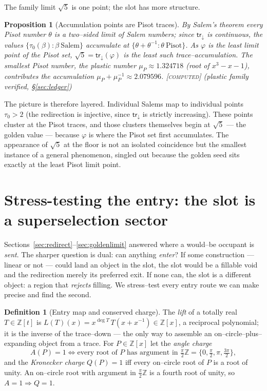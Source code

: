 \documentclass[11pt]{article}
\theoremstyle{plain}
\newtheorem{proposition}[theorem]{Proposition}
\theoremstyle{definition}
\newtheorem{definition}[theorem]{Definition}
\theoremstyle{remark}
\newcommand{\computed}{\textcolor{forcedc}{\textsc{[computed]}}}
\newcommand{\Z}{\mathbb{Z}}
\newcommand{\trace}{\mathsf{tr}_{\!\downarrow}}
\begin{document}
The family limit $\sqrt5$ is one point; the slot has more structure.

\begin{proposition}[Accumulation points are Pisot traces]\label{prop:pisot}
By Salem's theorem every Pisot number $\theta$ is a two--sided limit of Salem numbers; since $\trace$ is continuous, the values $\{\tau_0(\beta):\beta\ \text{Salem}\}$ accumulate at $\{\theta+\theta^{-1}:\theta\ \text{Pisot}\}$. As $\varphi$ is the least limit point of the Pisot set, $\sqrt5=\trace(\varphi)$ is the least such trace--accumulation. The smallest Pisot number, the plastic number $\mu_P\approx1.324718$ (root of $x^3-x-1$), contributes the accumulation $\mu_P+\mu_P^{-1}\approx2.079596$. \computed{} {\small(plastic family verified, \S\ref{sec:ledger})}
\end{proposition}

The picture is therefore layered. Individual Salems map to individual points $\tau_0>2$ (the redirection is injective, since $\trace$ is strictly increasing). These points cluster at the Pisot traces, and those clusters themselves begin at $\sqrt5$ --- the golden value --- because $\varphi$ is where the Pisot set first accumulates. The appearance of $\sqrt5$ at the floor is not an isolated coincidence but the smallest instance of a general phenomenon, singled out because the golden seed sits exactly at the least Pisot limit point.

\section{Stress-testing the entry: the slot is a superselection sector}\label{sec:entry}

Sections~\ref{sec:redirect}--\ref{sec:goldenlimit} answered where a would--be occupant is \emph{sent}. The sharper question is dual: can anything \emph{enter}? If some construction --- linear or not --- could land an object in the slot, the slot would be a fillable void and the redirection merely its preferred exit. If none can, the slot is a different object: a region that \emph{rejects} filling. We stress--test every entry route we can make precise and find the second.

\begin{definition}[Entry map and conserved charge]\label{def:entry}
The \emph{lift} of a totally real $T\in\Z[t]$ is $L(T)(x)=x^{\deg T}\,T(x+x^{-1})\in\Z[x]$, a reciprocal polynomial; it is the inverse of the trace--down --- the only way to assemble an on--circle--plus--expanding object from a trace. For $P\in\Z[x]$ let the \emph{angle charge}
\[
A(P)=1 \iff \text{every root of }P\text{ has argument in }\tfrac\pi2\Z=\{0,\tfrac\pi2,\pi,\tfrac{3\pi}2\},
\]
and the \emph{Kronecker charge} $Q(P)=1$ iff every on--circle root of $P$ is a root of unity. An on--circle root with argument in $\tfrac\pi2\Z$ is a fourth root of unity, so $A=1\Rightarrow Q=1$.
\end{definition}
\end{document}
